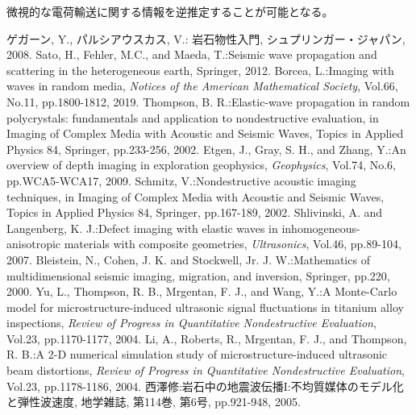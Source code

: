 \documentclass{jsce}
\begin{document}
微視的な電荷輸送に関する情報を逆推定することが可能となる。
\begin{thebibliography}{99}
\begin{spacing}{1.175}
	ゲガーン, Y., パルシアウスカス, V.: 
	岩石物性入門, シュプリンガー・ジャパン, 2008. 
	Sato, H., Fehler, M.C., and Maeda, T.:Seismic wave propagation and scattering in the heterogeneous earth, 
	Springer, 2012.
	Borcea, L.:Imaging with waves in random media, {\it Notices of the American Mathematical Society}, Vol.66, No.11, 
	pp.1800-1812, 2019.
	Thompson, B. R.:Elastic-wave propagation in random polycrystals: 
	fundamentals and application to nondestructive evaluation, 
	in Imaging of Complex Media with Acoustic and Seismic Waves, Topics in Applied Physics 84, Springer, pp.233-256, 2002.
	Etgen, J., Gray, S. H., and Zhang, Y.:An overview of depth imaging in exploration geophysics, 
	{\it Geophysics}, Vol.74, No.6, pp.WCA5-WCA17, 2009.
	Schmitz, V.:Nondestructive acoustic imaging techniques, in Imaging of Complex Media with Acoustic and Seismic Waves, 
	Topics in Applied Physics 84, Springer, pp.167-189, 2002.
	Shlivinski, A. and Langenberg, K. J.:Defect imaging with elastic waves in inhomogeneous-anisotropic materials with composite geometries, {\it Ultrasonics}, Vol.46, pp.89-104, 2007.
	Bleistein, N., Cohen, J. K. and Stockwell, Jr. J. W.:Mathematics of multidimensional seismic imaging, migration, and inversion, Springer, pp.220, 2000.
	Yu, L., Thompson, R. B., Mrgentan, F. J., and Wang, Y.:A Monte-Carlo model for microstructure-induced ultrasonic signal fluctuations in titanium alloy inspections,
	{\it Review of Progress in Quantitative Nondestructive Evaluation}, Vol.23, pp.1170-1177, 2004.
	Li, A., Roberts, R., Mrgentan, F. J., and Thompson, R. B.:A 2-D numerical simulation study of microstructure-induced  ultrasonic beam distortions,
	{\it Review of Progress in Quantitative Nondestructive Evaluation}, Vol.23, pp.1178-1186, 2004.
	西澤修:岩石中の地震波伝播I:不均質媒体のモデル化と弾性波速度, 地学雑誌, 第114巻, 第6号,  pp.921-948,  2005.

\end{spacing}
\end{thebibliography}
\end{document}
